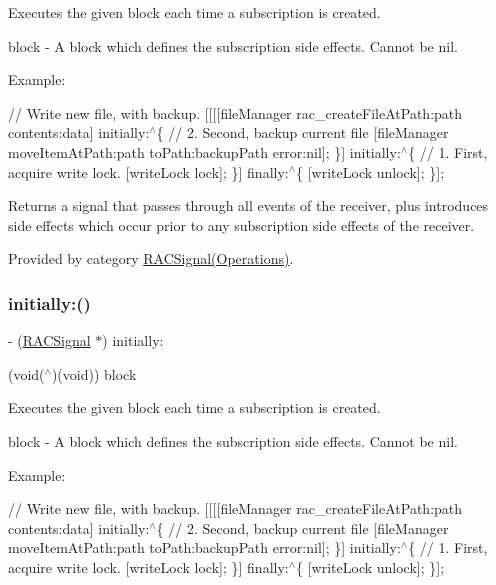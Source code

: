 Executes the given block each time a subscription is created.

block -\/ A block which defines the subscription side effects. Cannot be {\ttfamily nil}.

Example\+:

// Write new file, with backup. \mbox{[}\mbox{[}\mbox{[}\mbox{[}file\+Manager rac\+\_\+create\+File\+At\+Path\+:path contents\+:data\mbox{]} initially\+:$^\wedge$\{ // 2. Second, backup current file \mbox{[}file\+Manager move\+Item\+At\+Path\+:path to\+Path\+:backup\+Path error\+:nil\mbox{]}; \}\mbox{]} initially\+:$^\wedge$\{ // 1. First, acquire write lock. \mbox{[}write\+Lock lock\mbox{]}; \}\mbox{]} finally\+:$^\wedge$\{ \mbox{[}write\+Lock unlock\mbox{]}; \}\mbox{]};

Returns a signal that passes through all events of the receiver, plus introduces side effects which occur prior to any subscription side effects of the receiver. 

Provided by category \mbox{\hyperlink{category_r_a_c_signal_07_operations_08_a2c8566a5d3b5997357d34ee5991a2e0c}{R\+A\+C\+Signal(\+Operations)}}.

\mbox{\label{interface_r_a_c_signal_a2c8566a5d3b5997357d34ee5991a2e0c}} 
\subsubsection{\texorpdfstring{initially\+:()}{initially:()}\hspace{0.1cm}{\footnotesize\ttfamily [3/3]}}
{\footnotesize\ttfamily -\/ (\mbox{\hyperlink{interface_r_a_c_signal}{R\+A\+C\+Signal}} $\ast$) initially\+: \begin{DoxyParamCaption}\item[{(void($^\wedge$)(void))}]{block }\end{DoxyParamCaption}}

Executes the given block each time a subscription is created.

block -\/ A block which defines the subscription side effects. Cannot be {\ttfamily nil}.

Example\+:

// Write new file, with backup. \mbox{[}\mbox{[}\mbox{[}\mbox{[}file\+Manager rac\+\_\+create\+File\+At\+Path\+:path contents\+:data\mbox{]} initially\+:$^\wedge$\{ // 2. Second, backup current file \mbox{[}file\+Manager move\+Item\+At\+Path\+:path to\+Path\+:backup\+Path error\+:nil\mbox{]}; \}\mbox{]} initially\+:$^\wedge$\{ // 1. First, acquire write lock. \mbox{[}write\+Lock lock\mbox{]}; \}\mbox{]} finally\+:$^\wedge$\{ \mbox{[}write\+Lock unlock\mbox{]}; \}\mbox{]};

